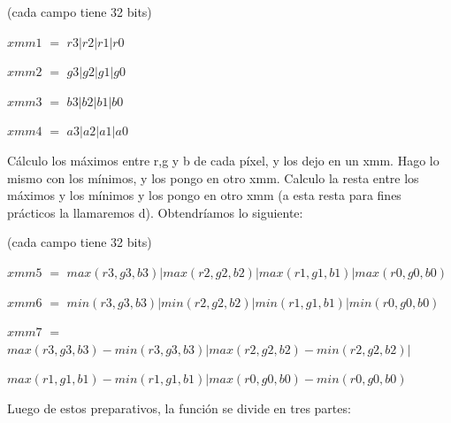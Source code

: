 \documentclass[a4paper]{article}
\begin{document}
\vspace*{0.3cm}

(cada campo tiene 32 bits)

\vspace*{0.3cm}

 $xmm1$ $=$ $r3|r2|r1|r0$

\vspace*{0.3cm}

 $xmm2$ $=$ $g3|g2|g1|g0$

\vspace*{0.3cm}

 $xmm3$ $=$ $b3|b2|b1|b0$

\vspace*{0.3cm}

 $xmm4$ $=$ $a3|a2|a1|a0$

\vspace*{0.3cm}

Cálculo los máximos entre r,g y b de cada píxel, y los dejo en un xmm. Hago lo mismo con los mínimos, y los pongo en otro xmm. Calculo la resta entre los máximos y los mínimos y los pongo en otro xmm (a esta resta para fines prácticos la llamaremos d). Obtendríamos lo siguiente:

 \vspace*{0.3cm}

(cada campo tiene 32 bits)

\vspace*{0.3cm}

 $xmm5$ $=$ $max(r3,g3,b3)|max(r2,g2,b2)|max(r1,g1,b1)|max(r0,g0,b0)$

\vspace*{0.3cm}

 $xmm6$ $=$ $min(r3,g3,b3)|min(r2,g2,b2)|min(r1,g1,b1)|min(r0,g0,b0)$

\vspace*{0.3cm}

 $xmm7$ $=$ $max(r3,g3,b3)-min(r3,g3,b3)|max(r2,g2,b2)-min(r2,g2,b2)|$
 
 \hspace*{1.45cm}$max(r1,g1,b1)-min(r1,g1,b1)|max(r0,g0,b0)-min(r0,g0,b0)$

\vspace*{0.3cm}


Luego de estos preparativos, la función se divide en tres partes:
\end{document}
